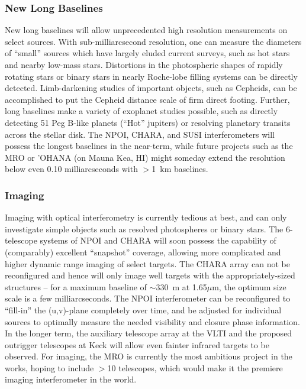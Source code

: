 \documentclass[12pt]{iopart}
\begin{document}
\subsubsection{New Long Baselines}
New long baselines will allow unprecedented high resolution
measurements on select sources.  With sub-milliarcsecond resolution,
one can measure the diameters of ``small'' sources which have largely
eluded current surveys, such as hot stars and nearby low-mass stars.
Distortions in the photospheric shapes of rapidly rotating stars or
binary stars in nearly Roche-lobe filling systems can be directly
detected.  Limb-darkening studies of important objects, such as
Cepheids, can be accomplished to put the Cepheid distance scale of
firm direct footing.  Further, long baselines make a variety of
exoplanet studies possible, such as directly detecting 51 Peg B-like
planets (``Hot'' jupiters) or resolving planetary transits across the
stellar disk.  The NPOI, CHARA, and SUSI interferometers will possess
the longest baselines in the near-term, while future projects such as
the MRO or 'OHANA (on Mauna Kea, HI) might
someday extend the resolution below even 0.10 milliarcseconds with
$>$1~km baselines.

\subsubsection{Imaging}
Imaging with optical interferometry is currently tedious at best, and
can only investigate simple objects such as resolved photospheres or
binary stars.  The 6-telescope systems of NPOI and CHARA will soon
possess the capability of (comparably) excellent ``snapshot''
coverage, allowing more complicated and higher dynamic range imaging
of select targets.  The CHARA array can not be reconfigured and hence
will only image well targets with the appropriately-sized structures
-- for a maximum baseline of $\sim$330~m at 1.65$\mu$m, the optimum
size scale is a few milliarcseconds.  The NPOI interferometer can be
reconfigured to ``fill-in'' the (u,v)-plane completely over time, and
be adjusted for individual sources to optimally measure the needed
visibility and closure phase information.  In the longer term, the
auxiliary telescope array at the VLTI and the proposed outrigger
telescopes at Keck will allow even fainter infrared targets to be
observed.  For imaging, the MRO is currently the most ambitious
project in the works, hoping to include $>$10 telescopes, which would
make it the premiere imaging interferometer in the world.
\end{document}
